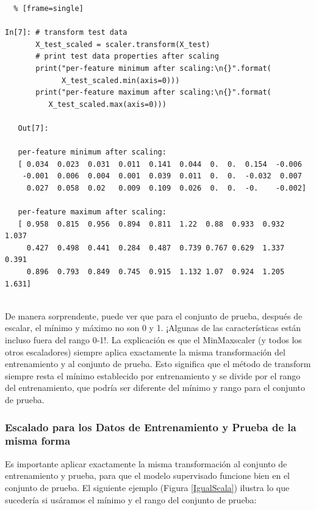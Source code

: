 \begin{lstlisting}  % [frame=single]

In[7]: # transform test data
       X_test_scaled = scaler.transform(X_test)
       # print test data properties after scaling
       print("per-feature minimum after scaling:\n{}".format(
             X_test_scaled.min(axis=0)))
       print("per-feature maximum after scaling:\n{}".format(
          X_test_scaled.max(axis=0)))
   
   Out[7]:
   
   per-feature minimum after scaling:
   [ 0.034  0.023  0.031  0.011  0.141  0.044  0.  0.  0.154  -0.006
    -0.001  0.006  0.004  0.001  0.039  0.011  0.  0.  -0.032  0.007
     0.027  0.058  0.02   0.009  0.109  0.026  0.  0.  -0.    -0.002]
  
   per-feature maximum after scaling:
   [ 0.958  0.815  0.956  0.894  0.811  1.22  0.88  0.933  0.932  1.037
     0.427  0.498  0.441  0.284  0.487  0.739 0.767 0.629  1.337  0.391
     0.896  0.793  0.849  0.745  0.915  1.132 1.07  0.924  1.205  1.631]


\end{lstlisting}

De manera sorprendente, puede ver que para el conjunto de prueba, después de  escalar, el  mínimo  y  máximo no son 0 y 1. ¡Algunas de las características están incluso fuera del rango 0-1!. La explicación es que el {\ttfamily MinMaxscaler} (y todos los otros escaladores) siempre aplica exactamente la misma transformación del entrenamiento y al conjunto de prueba. Esto significa que el método de {\ttfamily transform} siempre resta el mínimo establecido por entrenamiento y se divide por el rango del   entrenamiento, que podría ser diferente del mínimo y rango para el conjunto de prueba.



\subsubsection{Escalado para los Datos de Entrenamiento y Prueba de la misma forma}


 Es importante aplicar exactamente la misma transformación al conjunto de entrenamiento y  prueba, para que el modelo supervisado funcione bien en el conjunto de prueba. El siguiente ejemplo (Figura \ref{IgualScala}) ilustra lo que sucedería si usáramos el mínimo y el rango del conjunto de prueba: 


